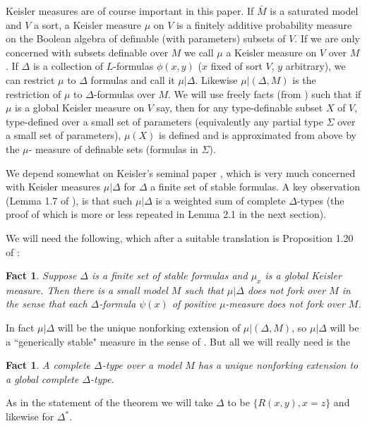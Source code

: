 \documentclass[12pt]{article}
\newtheorem{Fact}[Theorem]{Fact}
\begin{document}
Keisler measures are of course important in this paper. If ${\bar M}$ is a saturated model and $V$ a sort, a Keisler measure $\mu$ on $V$ is a finitely additive probability measure on the Boolean algebra of definable (with parameters) subsets of $V$. If we are only concerned with subsets definable over $M$ we call $\mu$ a Keisler measure on $V$ over $M$.  If $\Delta$ is a collection of $L$-formulas $\phi(x,y)$ ($x$ fixed of sort $V$, $y$ arbitrary), we can restrict $\mu$ to $\Delta$  formulas and call it $\mu|\Delta$. Likewise $\mu|(\Delta,M)$ is the restriction of $\mu$ to $\Delta$-formulas over $M$.  We will  use freely facts (from \cite{Keisler}) such that if $\mu$ is a global Keisler measure on $V$ say, then for any type-definable subset $X$ of $V$, type-defined over a small set of parameters (equivalently any partial type $\Sigma$ over a small set of parameters), $\mu(X)$ is defined and is approximated from above  by the $\mu$- measure of definable sets (formulas in $\Sigma$). 



We depend  somewhat on Keisler's seminal paper \cite{Keisler}, which is very much concerned with Keisler measures  $\mu|\Delta$ for $\Delta$ a finite set of stable formulas. A key observation (Lemma 1.7 of \cite{Keisler}), is that such $\mu|\Delta$ is a weighted sum of complete $\Delta$-types (the proof of which  is more or less repeated in Lemma 2.1 in the next section). 


 We will need the following, which  after a suitable translation is Proposition 1.20 of \cite{Keisler}: 
\begin{Fact} Suppose $\Delta$ is a finite set of stable formulas and $\mu_{x}$ is a global Keisler measure. Then there is a small model $M$ such that $\mu|\Delta$ does not fork over $M$ in the sense that each $\Delta$-formula $\psi(x)$ of positive $\mu$-measure does not fork over $M$.
\end{Fact}

In fact $\mu|\Delta$ will be the unique nonforking extension of $\mu|(\Delta,M)$, so $\mu|\Delta$ will be a ``generically stable" measure in the sense of \cite{HPS}. But all we will really need is the \begin{Fact} A complete $\Delta$-type over a model $M$ has a unique nonforking extension to a global complete $\Delta$-type. 
\end{Fact}



\vspace{2mm}
\noindent
As in the statement of the theorem we will take $\Delta$ to be $\{R(x,y),x=z\}$ and likewise for $\Delta^{*}$. 
\end{document}
